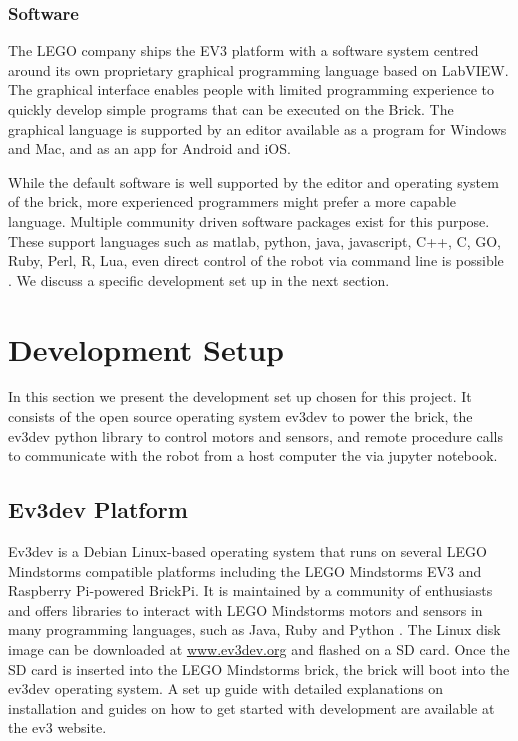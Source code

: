 \documentclass[11pt, a4paper]{article}
\begin{document}
\subsubsection{Software}
The LEGO company ships the EV3 platform with a software system centred around its own proprietary graphical programming language based on LabVIEW. The graphical interface enables people with limited programming experience to quickly develop simple programs that can be executed on the Brick. The graphical language is supported by an editor available as a program for Windows and Mac, and as an app for Android and iOS.

While the default software is well supported by the editor and operating system of the brick, more experienced programmers might prefer a more capable language. Multiple community driven software packages exist for this purpose. These support languages such as matlab, python, java, javascript, C++, C, GO, Ruby, Perl, R, Lua, even direct control of the robot via command line is possible \cite{ev3dev}. We discuss a specific development set up in the next section.



\section{Development Setup}
In this section we present the development set up chosen for this project. It consists of the open source operating system ev3dev to power the brick, the ev3dev python library to control motors and sensors, and remote procedure calls to communicate with the robot from a host computer the via jupyter notebook.

\subsection{Ev3dev Platform}
Ev3dev is a Debian Linux-based operating system that runs on several LEGO Mindstorms compatible platforms including the LEGO Mindstorms EV3 and Raspberry Pi-powered BrickPi. It is maintained by a community of enthusiasts and offers libraries to interact with LEGO Mindstorms motors and sensors in many programming languages, such as Java, Ruby and Python \cite{ev3dev}. The Linux disk image can be downloaded at \href{https://www.ev3dev.org/}{www.ev3dev.org} and flashed on a SD card. Once the SD card is inserted into the LEGO Mindstorms brick, the brick will boot into the ev3dev operating system. A set up guide with detailed explanations on installation and guides on how to get started with development are available at the ev3 website.
\end{document}
